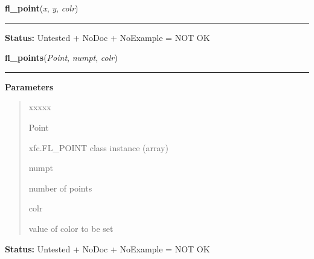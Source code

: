     \label{xformslib:library:fl_point}

    \vspace{0.5ex}

\hspace{.8\funcindent}\begin{boxedminipage}{\funcwidth}

    \raggedright \textbf{fl\_point}(\textit{x}, \textit{y}, \textit{colr})

    \vspace{-1.5ex}

    \rule{\textwidth}{0.5\fboxrule}
\setlength{\parskip}{2ex}
\setlength{\parskip}{1ex}
\textbf{Status:} Untested + NoDoc + NoExample = NOT OK



    \end{boxedminipage}

    \label{xformslib:library:fl_points}

    \vspace{0.5ex}

\hspace{.8\funcindent}\begin{boxedminipage}{\funcwidth}

    \raggedright \textbf{fl\_points}(\textit{Point}, \textit{numpt}, \textit{colr})

    \vspace{-1.5ex}

    \rule{\textwidth}{0.5\fboxrule}
\setlength{\parskip}{2ex}
\setlength{\parskip}{1ex}
      \textbf{Parameters}
      \vspace{-1ex}

      \begin{quote}
        \begin{Ventry}{xxxxx}

          \item[Point]

          xfc.FL\_POINT class instance (array)

          \item[numpt]

          number of points

          \item[colr]

          value of color to be set

        \end{Ventry}

      \end{quote}

\textbf{Status:} Untested + NoDoc + NoExample = NOT OK



    \end{boxedminipage}

